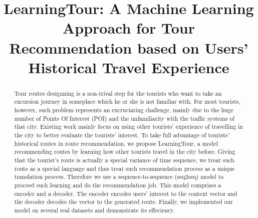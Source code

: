 \documentclass[runningheads]{llncs}
\begin{document}
%
\title{LearningTour: A Machine Learning Approach for Tour Recommendation based on Users' Historical Travel Experience}
%
%
\author{} 
%

%
\institute{}
%
\maketitle              %
%
\begin{abstract}
Tour routes designning is a non-trival step for the tourists who want to take an excursion journey in someplace which he or she is not familiar with. For most tourists, however, such problem represents an excruciating challenge, mainly due to the huge number of Points Of Interest (POI) and the unfamiliarity with the traffic systems of that city. Existing work mainly focus on using other tourists' experience of travelling in the city to better evaluate the tourists' interest. To take full advantage of tourists' historical routes in route recommendation, we propose LearningTour, a model recommending routes by learning how other tourists travel in the city before. Giving that the tourist's route is actually a special variance of time sequence, we treat such route as a special language and thus treat such recommendation process as a unique translation process. Therefore we use a sequence-to-sequence (seq2seq) model to proceed such learning and do the recommendation job. This model comprises a encoder and a decoder. The encoder encodes users' interest to the context vector and the decoder decodes the vector to the generated route. Finally, we implemented our model on several real datasets and demonstrate its effeciency.


\end{abstract}
%
%
%
\end{document}
